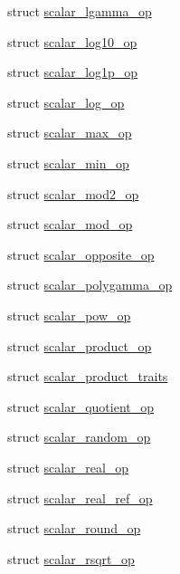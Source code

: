 \begin{DoxyCompactItemize}
\item 
struct \hyperlink{struct_eigen_1_1internal_1_1scalar__lgamma__op}{scalar\+\_\+lgamma\+\_\+op}
\item 
struct \hyperlink{struct_eigen_1_1internal_1_1scalar__log10__op}{scalar\+\_\+log10\+\_\+op}
\item 
struct \hyperlink{struct_eigen_1_1internal_1_1scalar__log1p__op}{scalar\+\_\+log1p\+\_\+op}
\item 
struct \hyperlink{struct_eigen_1_1internal_1_1scalar__log__op}{scalar\+\_\+log\+\_\+op}
\item 
struct \hyperlink{struct_eigen_1_1internal_1_1scalar__max__op}{scalar\+\_\+max\+\_\+op}
\item 
struct \hyperlink{struct_eigen_1_1internal_1_1scalar__min__op}{scalar\+\_\+min\+\_\+op}
\item 
struct \hyperlink{struct_eigen_1_1internal_1_1scalar__mod2__op}{scalar\+\_\+mod2\+\_\+op}
\item 
struct \hyperlink{struct_eigen_1_1internal_1_1scalar__mod__op}{scalar\+\_\+mod\+\_\+op}
\item 
struct \hyperlink{struct_eigen_1_1internal_1_1scalar__opposite__op}{scalar\+\_\+opposite\+\_\+op}
\item 
struct \hyperlink{struct_eigen_1_1internal_1_1scalar__polygamma__op}{scalar\+\_\+polygamma\+\_\+op}
\item 
struct \hyperlink{struct_eigen_1_1internal_1_1scalar__pow__op}{scalar\+\_\+pow\+\_\+op}
\item 
struct \hyperlink{struct_eigen_1_1internal_1_1scalar__product__op}{scalar\+\_\+product\+\_\+op}
\item 
struct \hyperlink{struct_eigen_1_1internal_1_1scalar__product__traits}{scalar\+\_\+product\+\_\+traits}
\item 
struct \hyperlink{struct_eigen_1_1internal_1_1scalar__quotient__op}{scalar\+\_\+quotient\+\_\+op}
\item 
struct \hyperlink{struct_eigen_1_1internal_1_1scalar__random__op}{scalar\+\_\+random\+\_\+op}
\item 
struct \hyperlink{struct_eigen_1_1internal_1_1scalar__real__op}{scalar\+\_\+real\+\_\+op}
\item 
struct \hyperlink{struct_eigen_1_1internal_1_1scalar__real__ref__op}{scalar\+\_\+real\+\_\+ref\+\_\+op}
\item 
struct \hyperlink{struct_eigen_1_1internal_1_1scalar__round__op}{scalar\+\_\+round\+\_\+op}
\item 
struct \hyperlink{struct_eigen_1_1internal_1_1scalar__rsqrt__op}{scalar\+\_\+rsqrt\+\_\+op}

\end{DoxyCompactItemize}
